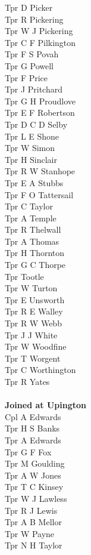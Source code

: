 \begin{multicols}{3}
  Tpr D Picker \\
  Tpr R Pickering \\
  Tpr W J Pickering \\
  Tpr C F Pilkington \\
  Tpr F S Povah \\
  Tpr G Powell \\
  Tpr F Price \\
  Tpr J Pritchard \\
  Tpr G H Proudlove \\
  Tpr E F Robertson \\
  Tpr D C D Selby \\
  Tpr L E Shone \\
  Tpr W Simon \\
  Tpr H Sinclair \\
  Tpr R W Stanhope \\
  Tpr E A Stubbs \\
  Tpr F O Tattersail \\
  Tpr C Taylor \\
  Tpr A Temple \\
  Tpr R Thelwall \\
  Tpr A Thomas \\
  Tpr H Thornton \\
  Tpr G C Thorpe \\
  Tpr Tootle \\
  Tpr W Turton \\
  Tpr E Unsworth \\
  Tpr R E Walley \\
  Tpr R W Webb \\
  Tpr J J White \\
  Tpr W Woodfine \\
  Tpr T Worgent \\
  Tpr C Worthington \\
  Tpr R Yates \\
  \\
  \textbf{Joined at Upington} \\
  Cpl A Edwards \\
  Tpr H S Banks \\
  Tpr A Edwards \\
  Tpr G F Fox \\
  Tpr M Goulding \\
  Tpr A W Jones \\
  Tpr T C Kinsey \\
  Tpr W J Lawless \\
  Tpr R J Lewis \\
  Tpr A B Mellor \\
  Tpr W Payne \\
  Tpr N H Taylor \\
\end{multicols}

